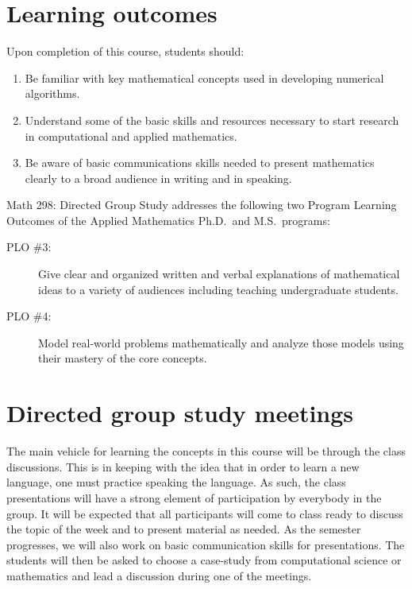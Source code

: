 \documentclass{article}
\newcommand{\secskip}{\vspace{6pt}}
\begin{document}
\secskip

\noindent
\section*{Learning outcomes} Upon completion of this course, students should:
\begin{enumerate}

\item Be familiar with key mathematical concepts used in developing numerical algorithms.
 
\item Understand some of the basic skills and resources necessary to start research in computational and applied mathematics.

\item Be aware of basic communications skills needed to present mathematics clearly to a
  broad audience in writing and in speaking.
  
\end{enumerate}

\secskip

\noindent
Math 298: Directed Group Study addresses the following two Program Learning Outcomes of the Applied Mathematics
Ph.D.~and M.S.~programs:

\begin{description}
\item[\quad PLO \#3:] Give clear and organized written and verbal explanations
  of mathematical ideas to a variety of audiences including teaching
  undergraduate students.
\item[\quad PLO \#4:] Model real-world problems mathematically and analyze those models using their mastery of the core concepts. 
\end{description}

\section*{Directed group study meetings}

The main vehicle for learning the concepts in this course will be through the class discussions.  This is in keeping with the idea that in order to learn a new language, one must practice speaking the language.   As such, the class presentations will have a strong element of participation by everybody in the group.  It will be expected that all participants will come to class ready to discuss the topic of the week and to present material as needed.  As the semester progresses, we will also work on basic communication skills for presentations.  The students will then be asked to choose a case-study from computational science or mathematics and lead a discussion during one of the meetings. 
\end{document}
